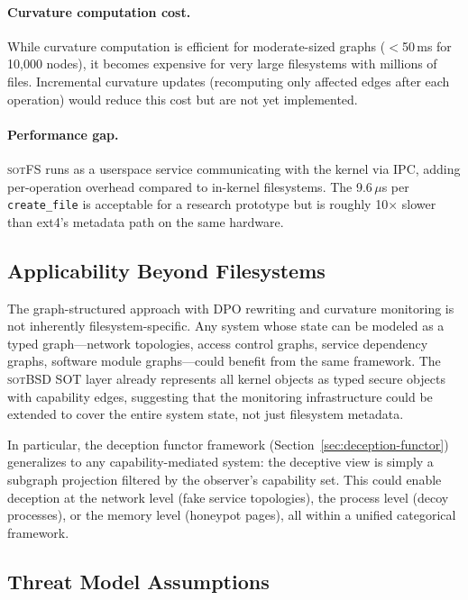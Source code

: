 \documentclass[11pt,a4paper]{article}
\theoremstyle{definition}
\theoremstyle{remark}
\newcommand{\sotfs}{\textsc{sotFS}}
\newcommand{\sotbsd}{\textsc{sotBSD}}
\begin{document}
\paragraph{Curvature computation cost.}
While curvature computation is efficient for moderate-sized graphs
($<$50\,ms for 10{,}000 nodes), it becomes expensive for very large
filesystems with millions of files. Incremental curvature updates
(recomputing only affected edges after each operation) would reduce
this cost but are not yet implemented.

\paragraph{Performance gap.}
\sotfs{} runs as a userspace service communicating with the kernel
via IPC, adding per-operation overhead compared to in-kernel
filesystems. The 9.6\,$\mu$s per \texttt{create\_file} is acceptable
for a research prototype but is roughly 10$\times$ slower than ext4's
metadata path on the same hardware.

\subsection{Applicability Beyond Filesystems}
\label{sec:discussion-applicability}

The graph-structured approach with DPO rewriting and curvature
monitoring is not inherently filesystem-specific. Any system whose
state can be modeled as a typed graph---network topologies, access
control graphs, service dependency graphs, software module
graphs---could benefit from the same framework. The \sotbsd{} SOT
layer already represents all kernel objects as typed secure objects
with capability edges, suggesting that the monitoring infrastructure
could be extended to cover the entire system state, not just
filesystem metadata.

In particular, the deception functor framework
(Section~\ref{sec:deception-functor}) generalizes to any
capability-mediated system: the deceptive view is simply a subgraph
projection filtered by the observer's capability set. This could
enable deception at the network level (fake service topologies),
the process level (decoy processes), or the memory level (honeypot
pages), all within a unified categorical framework.

\subsection{Threat Model Assumptions}
\label{sec:discussion-threats}
\end{document}
